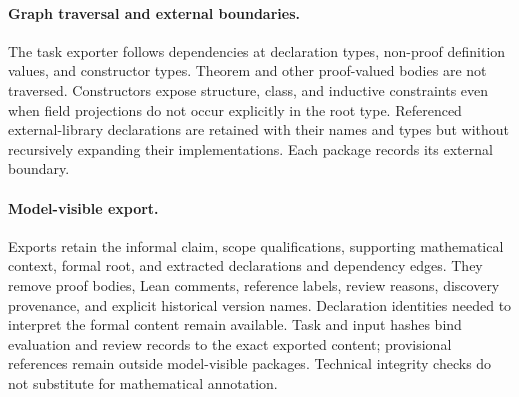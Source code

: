 \paragraph{Graph traversal and external boundaries.}
The task exporter follows dependencies at declaration types, non-proof definition values, and constructor types. Theorem and other proof-valued bodies are not traversed. Constructors expose structure, class, and inductive constraints even when field projections do not occur explicitly in the root type. Referenced external-library declarations are retained with their names and types but without recursively expanding their implementations. Each package records its external boundary.

\paragraph{Model-visible export.}
Exports retain the informal claim, scope qualifications, supporting mathematical context, formal root, and extracted declarations and dependency edges. They remove proof bodies, Lean comments, reference labels, review reasons, discovery provenance, and explicit historical version names. Declaration identities needed to interpret the formal content remain available. Task and input hashes bind evaluation and review records to the exact exported content; provisional references remain outside model-visible packages. Technical integrity checks do not substitute for mathematical annotation.
